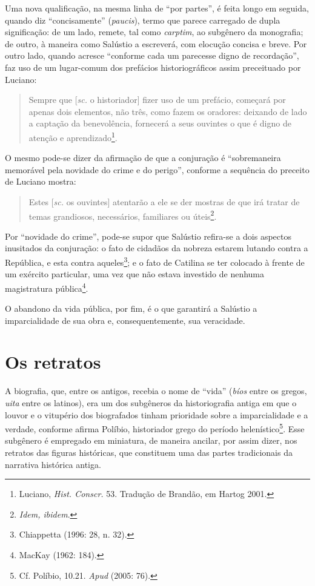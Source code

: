 Uma nova qualificação, na mesma linha de ``por partes'', é feita longo em
seguida, quando diz “concisamente” (\emph{paucis}), termo que parece carregado de dupla
significação: de um lado, remete, tal como \emph{carptim}, ao subgênero da
monografia; de outro, à maneira como Salústio a escreverá, com elocução concisa e breve. Por outro lado, quando acresce “conforme cada um
parecesse digno de recordação”, faz uso de um lugar-comum dos prefácios
historiográficos assim preceituado por Luciano:

 

\begin{quote} Sempre que [\emph{sc.} o historiador] fizer uso de um prefácio,
  começará por apenas dois elementos, não três, como fazem os oradores:
  deixando de lado a captação da benevolência, fornecerá a seus ouvintes o que
  é digno de atenção e aprendizado\footnote{Luciano, \emph{Hist. Conscr.} 53. Tradução de Brandão, em Hartog 2001.}. 

\end{quote}

O mesmo pode-se dizer da afirmação de que a conjuração é “sobremaneira
memorável pela novidade do crime e do perigo”, conforme a sequência do preceito
de Luciano mostra:

\begin{quote}

Estes [\emph{sc.} os ouvintes] atentarão a ele se der mostras de que irá tratar
de temas grandiosos, necessários, familiares ou úteis\footnote{\emph{Idem,
ibidem}.}.

\end{quote}

 
Por “novidade do crime”, pode-se supor que Salústio refira-se a dois
aspectos inusitados da conjuração: o fato de cidadãos da nobreza estarem
lutando contra a República, e esta contra aqueles\footnote{Chiappetta (1996:
28, n. 32).}; e o fato de Catilina se ter colocado à frente de um exército
particular, uma vez que não estava investido de nenhuma magistratura
pública\footnote{MacKay (1962: 184).}.

O abandono da vida pública, por fim, é o que garantirá a Salústio a imparcialidade de sua obra e, consequentemente, sua veracidade. 

\section{Os retratos}

A biografia, que, entre os antigos, recebia o nome de “vida” (\emph{bíos} entre
os gregos, \emph{uita} entre os latinos), era um dos subgêneros da
historiografia antiga em que o louvor e o vitupério dos biografados tinham
prioridade sobre a imparcialidade e a verdade, conforme afirma 
Políbio, historiador grego do período helenístico\footnote{ Cf. Políbio, 10.21. \emph{Apud}  (2005: 76).}. 
Esse subgênero é empregado em miniatura, de maneira ancilar, por assim dizer, nos retratos das
figuras históricas, que constituem uma das partes tradicionais da narrativa
histórica antiga.


